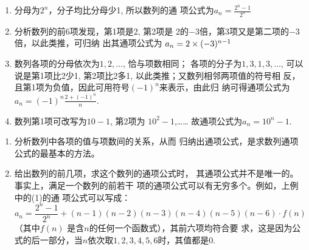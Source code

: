 \begin{solution}
\begin{enumerate}[(1)]
    \item 分母为$2^n$，分子均比分母少1, 所以数列的通
    项公式为$a_n=\frac{2^n-1}{2^n}$
    \item 分析数列的前6项发现，第1项是2, 第2项是
    2的$-3$倍，第3项又是第二项的$-3$倍，以此类推，可归纳
    出其通项公式为
    $a_n=2\times(-3)^{n-1}$
    \item 数列各项的分母依次为$1,2,\ldots$, 恰与项数相同；
    各项的分子为$1,3,1,3,\ldots$, 可以说是第1项比2少1,
    第2项比2多1, 以此类推；又数列相邻两项值的符号相
    反，且第1项为负值，因此可用符号$(-1)^n$来表示，由此归
    纳可得通项公式为
    $a_n=(-1)^{n}\frac{2+(-1)^n}{n}$.
    \item 数列第1项可改写为$10-1$, 第2项为
    $10^2-1$,……
    故通项公式为$a_n=10^n-1$.
\end{enumerate}
\end{solution}

\begin{rmk}
\begin{enumerate}[(1)]
    \item  分析数列中各项的值与项数间的关系，从而
    归纳出通项公式，是求数列通项公式的最基本的方法。
    \item 给出数列的前几项，求这个数列的通项公式时，
    其通项公式并不是唯一的。事实上，满足一个数列的前若干
    项的通项公式可以有无穷多个。例如，上例中的(1)的通
    项公式可以写成：
\[a_n=\frac{2^n-1}{2^n}+(n-1)(n-2)(n-3)(n-4)(n-5)(n-6)\cdot f(n)\]
（其中$f(n)$
是含$n$的任何一个函数式），其前六项均符合要
求，这是因为公式的后一部分，当$n$依次取$1,2,3,4,5,
6$时，其值都是0.
\end{enumerate}
\end{rmk}

